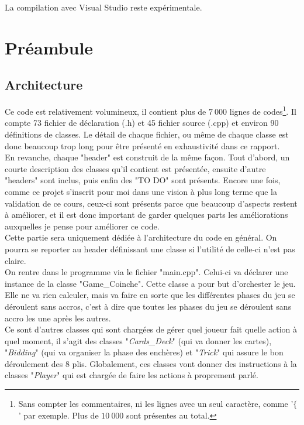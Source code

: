 \documentclass[a4paper,11pt]{article}
\begin{document}
La compilation avec Visual Studio reste expérimentale.
\clearpage
\section{Préambule}
\subsection{Architecture}
Ce code est relativement volumineux, il contient plus de $7~000$ lignes de codes\footnote{Sans compter les commentaires, ni les lignes avec un seul caractère, comme '$\{$' par exemple. Plus de $10~000$ sont présentes au total.}. Il compte 73 fichier de déclaration (.h) et 45 fichier source (.cpp) et environ 90 définitions de classes. Le détail de chaque fichier, ou même de chaque classe est donc beaucoup trop long pour être présenté en exhaustivité dans ce rapport. \\
En revanche, chaque "header" est construit de la même façon. Tout d'abord, un courte description des classes qu'il contient est présentée, ensuite d'autre "headers" sont inclus, puis enfin des "TO DO" sont présents. Encore une fois, comme ce projet s'inscrit pour moi dans une vision à plus long terme que la validation de ce cours, ceux-ci sont présents parce que beaucoup d'aspects restent à améliorer, et il est donc important de garder quelques parts les améliorations auxquelles je pense pour améliorer ce code.\\
Cette partie sera uniquement dédiée à l'architecture du code en général. On pourra se reporter au header définissant une classe si l'utilité de celle-ci n'est pas claire. \\

On rentre dans le programme via le fichier "main.cpp". Celui-ci va déclarer une instance de la classe "Game\_Coinche". Cette classe a pour but d'orchester le jeu. Elle ne va rien calculer, mais va faire en sorte que les différentes phases du jeu se déroulent sans accros, c'est à dire que toutes les phases du jeu se déroulent sans accro les une après les autres. \\

Ce sont d'autres classes qui sont chargées de gérer quel joueur fait quelle action à quel moment, il s'agit des classes "\textit{Cards\_Deck}" (qui va donner les cartes), "\textit{Bidding}" (qui va organiser la phase des enchères) et "\textit{Trick}" qui assure le bon déroulement des 8 plis. Globalement, ces classes vont donner des instructions à la classes "\textit{Player}" qui est chargée de faire les actions à proprement parlé. \\
\end{document}
